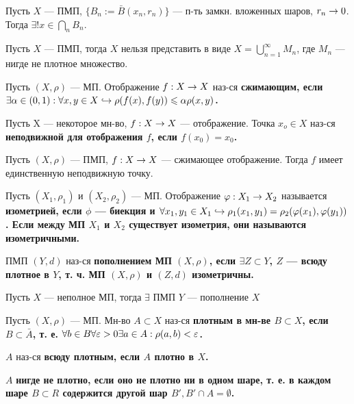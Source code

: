 \begin{thm}
Пусть $X$ --- ПМП, $\{B_n := \bar{B}(x_n, r_n)\}$ --- п-ть замкн. вложенных шаров, $r_n \rightarrow 0$. Тогда $\exists! x \in \bigcap\limits_n B_n$.
\end{thm}

\begin{thm}[2.2, Бэр]
Пусть $X$ --- ПМП, тогда $X$ нельзя представить в виде $X = \bigcup\limits_{n=1}^\infty M_n$, где $M_n$ --- нигде не плотное множество.
\end{thm}

\begin{defn}
Пусть $(X, \rho)$ --- МП. Отображение $f: X \rightarrow X$ наз-ся \bf{сжимающим}, если $\exists \alpha \in (0, 1): \forall x, y \in X \hookrightarrow \rho(f(x), f(y)) \leqslant \alpha \rho(x, y)$.
\end{defn}

\begin{defn}
Пусть X --- некоторое мн-во, $f: X \rightarrow X$ --- отображение. Точка $x_o \in X$ наз-ся \bf{неподвижной} для отображения $f$, если $f(x_0) = x_0$.
\end{defn}

\begin{thm}
Пусть $(X, \rho)$ --- ПМП, $f: X \rightarrow X$ --- сжимающее отображение. Тогда $f$ имеет единственную неподвижную точку.
\end{thm}

\begin{defn}
Пусть $(X_1, \rho_1)$ и $(X_2, \rho_2)$ --- МП. Отображение $\varphi: X_1 \rightarrow X_2$ называется \bf{изометрией}, если $\phi$ --- биекция и $\forall x_1, y_1 \in X_1 \hookrightarrow \rho_1(x_1, y_1) = \rho_2(\varphi(x_1), \varphi(y_1))$. Если между МП $X_1$ и $X_2$ существует изометрия, они называются \bf{изометричными}.
\end{defn}

\begin{defn}
ПМП $(Y, d)$ наз-ся \bf{пополнением} МП $(X, \rho)$, если $\exists Z \subset Y$, $Z$ --- всюду плотное в $Y$, т. ч. МП $(X, \rho)$ и $(Z, d)$ изометричны.
\end{defn}

\begin{thm}[2.4, Хаусдорф]
Пусть $X$ --- неполное МП, тогда $\exists$ ПМП $Y$ --- пополнение $X$
\end{thm}

\begin{defn}
Пусть $(X, \rho)$ --- МП. Мн-во $A \subset X$ наз-ся \bf{плотным в мн-ве $B \subset X$}, если $B \subset \bar{A}$, т. е. $\forall b \in B \forall \varepsilon > 0 \exists a \in A: \rho(a, b) < \varepsilon$.

$A$ наз-ся \bf{всюду плотным}, если $A$ плотно в $X$.

$A$ \bf{нигде не плотно}, если оно не плотно ни в одном шаре, т. е. в каждом шаре $B \subset R$ содержится другой шар $B', B' \cap A = \emptyset$.
\end{defn}

